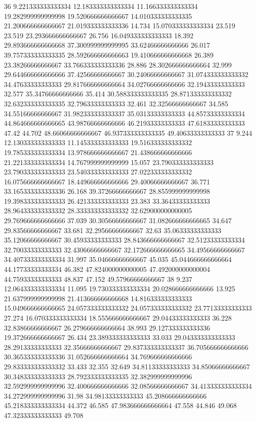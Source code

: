 36 9.221333333333334 12.183333333333334 11.166333333333334 19.282999999999998 19.520666666666667 14.010333333333335 21.200666666666667 21.019333333333336 14.734 15.070333333333334 23.519 23.519 23.293666666666667 26.756 16.049333333333333 18.392 29.893666666666668 37.300999999999995 33.62466666666666 26.017 39.757333333333335 28.592666666666663 19.410666666666668 26.389 23.38266666666667 33.766333333333336 28.886 28.302666666666664 32.999 29.644666666666666 37.42566666666667 30.24066666666667 31.074333333333332 34.47633333333333 29.817666666666664 34.02766666666666 32.19433333333333 32.577 35.34766666666666 35.414 30.588333333333335 28.871333333333332 32.632333333333335 32.79633333333333 32.461 32.32566666666667 34.585 34.55166666666667 31.982333333333337 35.03133333333333 44.85733333333334 44.864666666666665 43.98766666666666 46.21933333333333 47.61833333333333 47.42 44.702 48.66066666666667 46.937333333333335 49.40633333333333
37 9.244 12.130333333333333 11.145333333333333 19.516333333333332 19.785333333333334 13.978666666666667 21.438666666666666 21.221333333333334 14.767999999999999 15.057 23.790333333333333 23.790333333333333 23.540333333333333 27.022333333333332 16.075666666666667 18.449666666666666 29.40066666666667 36.771 33.165333333333336 26.168 39.37266666666667 28.855999999999998 19.398333333333333 26.421333333333333 23.383 33.36433333333333 28.964333333333332 28.333333333333332 32.629000000000005 29.769666666666666 37.039 30.30566666666667 31.082666666666665 34.647 29.83566666666667 33.681 32.29566666666667 32.63 35.06333333333333 35.12066666666667 30.45933333333333 28.843666666666667 32.51233333333334 32.70033333333333 32.43066666666667 32.172666666666665 34.49566666666667 34.407333333333334 31.997 35.04666666666667 45.035 45.044666666666664 44.17733333333334 46.382 47.824000000000005 47.492000000000004 44.75933333333333 48.837 47.152 49.57966666666667
38 9.237 12.064333333333334 11.095 19.730333333333334 20.028666666666666 13.925 21.637999999999998 21.413666666666668 14.816333333333333 15.049666666666665 24.057333333333332 24.057333333333332 23.77133333333333 27.274 16.070333333333334 18.555666666666667 29.04433333333333 36.228 32.83866666666667 26.279666666666664 38.993 29.127333333333336 19.372666666666667 26.434 23.389333333333333 33.033 29.043333333333333 28.29133333333333 32.35666666666667 29.837333333333337 36.705666666666666 30.365333333333336 31.052666666666664 34.769666666666666 29.833333333333332 33.433 32.355 32.649 34.81133333333333 34.85066666666667 30.348333333333333 28.792333333333335 32.382999999999996 32.592999999999996 32.400666666666666 32.08566666666667 34.413333333333334 34.272999999999996 31.98 34.98133333333333 45.208666666666666 45.218333333333334 44.372 46.585 47.983666666666664 47.558 44.846 49.068 47.32333333333333 49.708
